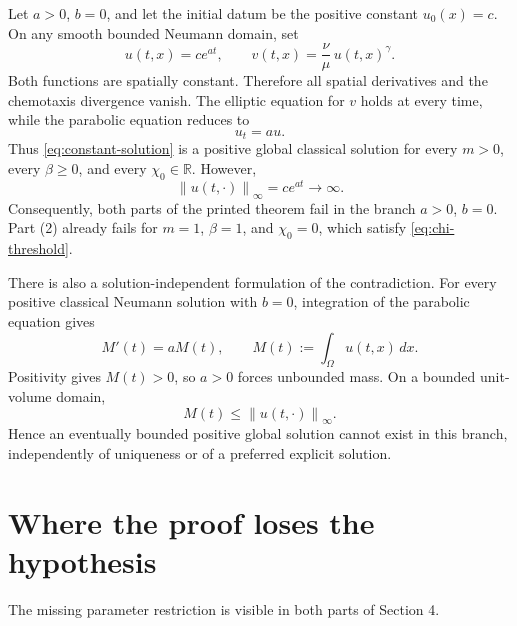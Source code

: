 \documentclass[11pt]{article}
\newcommand{\R}{\mathbb{R}}
\newcommand{\Om}{\Omega}
\newcommand{\norm}[1]{\left\lVert #1\right\rVert}
\begin{document}
Let $a>0$, $b=0$, and let the initial datum be the positive constant
$u_0(x)=c$.  On any smooth bounded Neumann domain, set
\begin{equation}
  u(t,x)=c e^{at},
  \qquad
  v(t,x)=\frac{\nu}{\mu}\,u(t,x)^\gamma.
  \label{eq:constant-solution}
\end{equation}
Both functions are spatially constant.  Therefore all spatial derivatives and
the chemotaxis divergence vanish.  The elliptic equation for $v$ holds at
every time, while the parabolic equation reduces to
\begin{equation}
  u_t=a u.
\end{equation}
Thus \eqref{eq:constant-solution} is a positive global classical solution for
every $m>0$, every $\beta\geq 0$, and every $\chi_0\in\R$.  However,
\begin{equation}
  \norm{u(t,\cdot)}_\infty = c e^{at}\longrightarrow\infty.
\end{equation}
Consequently, both parts of the printed theorem fail in the branch
$a>0$, $b=0$.  Part (2) already fails for $m=1$, $\beta=1$, and $\chi_0=0$,
which satisfy \eqref{eq:chi-threshold}.

There is also a solution-independent formulation of the contradiction.  For
every positive classical Neumann solution with $b=0$, integration of the
parabolic equation gives
\begin{equation}
  M'(t)=aM(t),
  \qquad
  M(t):=\int_\Om u(t,x)\,dx.
  \label{eq:mass-ode}
\end{equation}
Positivity gives $M(t)>0$, so $a>0$ forces unbounded mass.  On a bounded
unit-volume domain,
\begin{equation}
  M(t)\leq \norm{u(t,\cdot)}_\infty.
\end{equation}
Hence an eventually bounded positive global solution cannot exist in this
branch, independently of uniqueness or of a preferred explicit solution.

\section{Where the proof loses the hypothesis}

The missing parameter restriction is visible in both parts of Section 4.
\end{document}

